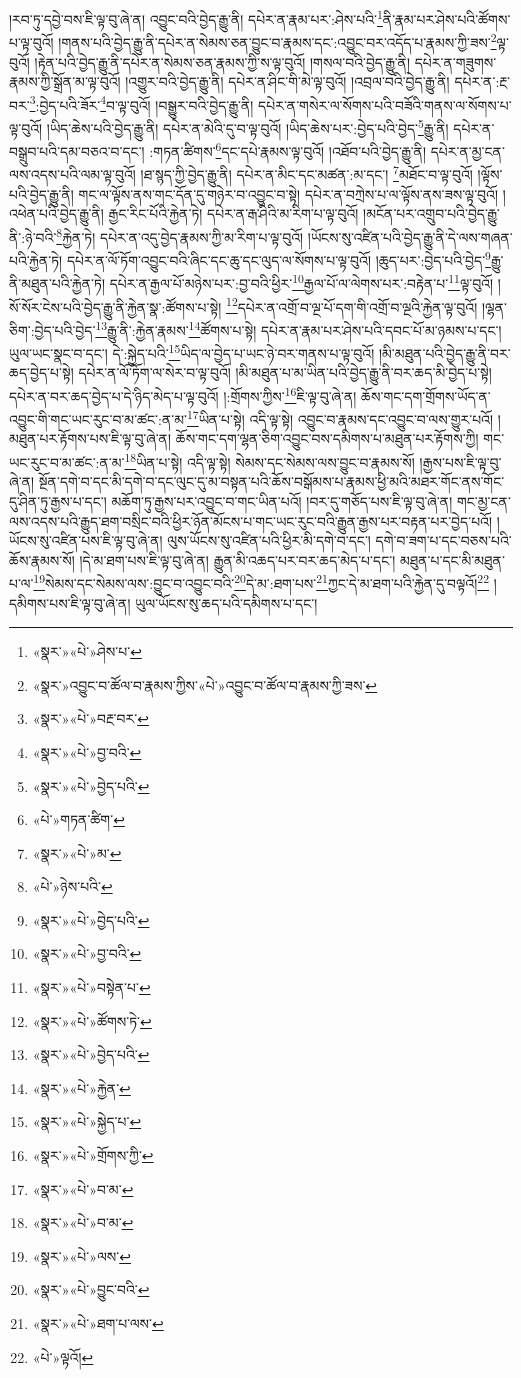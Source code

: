 །རབ་ཏུ་དབྱེ་བས་ཇི་ལྟ་བུ་ཞེ་ན། འབྱུང་བའི་བྱེད་རྒྱུ་ནི། དཔེར་ན་རྣམ་པར་:ཤེས་པའི་\footnote{«སྣར་»«པེ་»ཤེས་པ་}ནི་རྣམ་པར་ཤེས་པའི་ཚོགས་པ་ལྟ་བུའོ། །གནས་པའི་བྱེད་རྒྱུ་ནི་དཔེར་ན་སེམས་ཅན་བྱུང་བ་རྣམས་དང་:འབྱུང་བར་འདོད་པ་རྣམས་ཀྱི་ཟས་\footnote{«སྣར་»འབྱུང་བ་ཚོལ་བ་རྣམས་ཀྱིས་«པེ་»འབྱུང་བ་ཚོལ་བ་རྣམས་ཀྱི་ཟས་}ལྟ་བུའོ། །རྟེན་པའི་བྱེད་རྒྱུ་ནི་དཔེར་ན་སེམས་ཅན་རྣམས་ཀྱི་ས་ལྟ་བུའོ། །གསལ་བའི་བྱེད་རྒྱུ་ནི། དཔེར་ན་གཟུགས་རྣམས་ཀྱི་སྒྲོན་མ་ལྟ་བུའོ། །འགྱུར་བའི་བྱེད་རྒྱུ་ནི། དཔེར་ན་ཤིང་གི་མེ་ལྟ་བུའོ། །འབྲལ་བའི་བྱེད་རྒྱུ་ནི། དཔེར་ན་:རྔ་བར་\footnote{«སྣར་»«པེ་»བརྔ་བར་}:བྱེད་པའི་ཟོར་\footnote{«སྣར་»«པེ་»བྱ་བའི་}བ་ལྟ་བུའོ། །བསྒྱུར་བའི་བྱེད་རྒྱུ་ནི། དཔེར་ན་གསེར་ལ་སོགས་པའི་བཟོའི་གནས་ལ་སོགས་པ་ལྟ་བུའོ། །ཡིད་ཆེས་པའི་བྱེད་རྒྱུ་ནི། དཔེར་ན་མེའི་དུ་བ་ལྟ་བུའོ། །ཡིད་ཆེས་པར་:བྱེད་པའི་བྱེད་\footnote{«སྣར་»«པེ་»བྱེད་པའི་}རྒྱུ་ནི། དཔེར་ན་བསྒྲུབ་པའི་དམ་བཅའ་བ་དང་། :གཏན་ཚིགས་\footnote{«པེ་»གཏན་ཚིག་}དང་དཔེ་རྣམས་ལྟ་བུའོ། །འཐོབ་པའི་བྱེད་རྒྱུ་ནི། དཔེར་ན་མྱ་ངན་ལས་འདས་པའི་ལམ་ལྟ་བུའོ། །ཐ་སྙད་ཀྱི་བྱེད་རྒྱུ་ནི། དཔེར་ན་མིང་དང་མཚན་:མ་དང་། \footnote{«སྣར་»«པེ་»མ་}མཐོང་བ་ལྟ་བུའོ། །ལྟོས་པའི་བྱེད་རྒྱུ་ནི། གང་ལ་ལྟོས་ནས་གང་དོན་དུ་གཉེར་བ་འབྱུང་བ་སྟེ། དཔེར་ན་བཀྲེས་པ་ལ་ལྟོས་ནས་ཟས་ལྟ་བུའོ། །འཕེན་པའི་བྱེད་རྒྱུ་ནི། རྒྱང་རིང་པོའི་རྐྱེན་ཏེ། དཔེར་ན་རྒ་ཤིའི་མ་རིག་པ་ལྟ་བུའོ། །མངོན་པར་འགྲུབ་པའི་བྱེད་རྒྱུ་ནི་:ཉེ་བའི་\footnote{«པེ་»ཉེས་པའི་}རྐྱེན་ཏེ། དཔེར་ན་འདུ་བྱེད་རྣམས་ཀྱི་མ་རིག་པ་ལྟ་བུའོ། །ཡོངས་སུ་འཛིན་པའི་བྱེད་རྒྱུ་ནི་དེ་ལས་གཞན་པའི་རྐྱེན་ཏེ། དཔེར་ན་ལོ་ཏོག་འབྱུང་བའི་ཞིང་དང་ཆུ་དང་ལུད་ལ་སོགས་པ་ལྟ་བུའོ། །ཆུད་པར་:བྱེད་པའི་བྱེད་\footnote{«སྣར་»«པེ་»བྱེད་པའི་}རྒྱུ་ནི་མཐུན་པའི་རྐྱེན་ཏེ། དཔེར་ན་རྒྱལ་པོ་མཉེས་པར་:བྱ་བའི་ཕྱིར་\footnote{«སྣར་»«པེ་»བྱ་བའི་}རྒྱལ་པོ་ལ་ལེགས་པར་:བརྟེན་པ་\footnote{«སྣར་»«པེ་»བསྟེན་པ་}ལྟ་བུའོ། །སོ་སོར་ངེས་པའི་བྱེད་རྒྱུ་ནི་རྐྱེན་སྣ་:ཚོགས་པ་སྟེ། \footnote{«སྣར་»«པེ་»ཚོགས་ཏེ་}དཔེར་ན་འགྲོ་བ་ལྔ་པོ་དག་གི་འགྲོ་བ་ལྔའི་རྐྱེན་ལྟ་བུའོ། །ལྷན་ཅིག་:བྱེད་པའི་བྱེད་\footnote{«སྣར་»«པེ་»བྱེད་པའི་}རྒྱུ་ནི་:རྐྱེན་རྣམས་\footnote{«སྣར་»«པེ་»རྐྱེན་}ཚོགས་པ་སྟེ། དཔེར་ན་རྣམ་པར་ཤེས་པའི་དབང་པོ་མ་ཉམས་པ་དང་། ཡུལ་ཡང་སྣང་བ་དང་། དེ་:སྐྱེད་པའི་\footnote{«སྣར་»«པེ་»སྐྱེད་པ་}ཡིད་ལ་བྱེད་པ་ཡང་ཉེ་བར་གནས་པ་ལྟ་བུའོ། །མི་མཐུན་པའི་བྱེད་རྒྱུ་ནི་བར་ཆད་བྱེད་པ་སྟེ། དཔེར་ན་ལོ་ཏོག་ལ་སེར་བ་ལྟ་བུའོ། །མི་མཐུན་པ་མ་ཡིན་པའི་བྱེད་རྒྱུ་ནི་བར་ཆད་མི་བྱེད་པ་སྟེ། དཔེར་ན་བར་ཆད་བྱེད་པ་དེ་ཉིད་མེད་པ་ལྟ་བུའོ། །:གྲོགས་ཀྱིས་\footnote{«སྣར་»«པེ་»གྲོགས་ཀྱི་}ཇི་ལྟ་བུ་ཞེ་ན། ཆོས་གང་དག་གྲོགས་ཡོད་ན་འབྱུང་གི་གང་ཡང་རུང་བ་མ་ཚང་:ན་མ་\footnote{«སྣར་»«པེ་»བ་མ་}ཡིན་པ་སྟེ། འདི་ལྟ་སྟེ། འབྱུང་བ་རྣམས་དང་འབྱུང་བ་ལས་གྱུར་པའོ། །མཐུན་པར་རྟོགས་པས་ཇི་ལྟ་བུ་ཞེ་ན། ཆོས་གང་དག་ལྷན་ཅིག་འབྱུང་བས་དམིགས་པ་མཐུན་པར་རྟོགས་ཀྱི། གང་ཡང་རུང་བ་མ་ཚང་:ན་མ་\footnote{«སྣར་»«པེ་»བ་མ་}ཡིན་པ་སྟེ། འདི་ལྟ་སྟེ། སེམས་དང་སེམས་ལས་བྱུང་བ་རྣམས་སོ། །རྒྱས་པས་ཇི་ལྟ་བུ་ཞེ་ན། སྔོན་དགེ་བ་དང་མི་དགེ་བ་དང་ལུང་དུ་མ་བསྟན་པའི་ཆོས་བསྒོམས་པ་རྣམས་ཕྱི་མའི་མཐར་གོང་ནས་གོང་དུ་ཤིན་ཏུ་རྒྱས་པ་དང་། མཆོག་ཏུ་རྒྱས་པར་འབྱུང་བ་གང་ཡིན་པའོ། །བར་དུ་གཅོད་པས་ཇི་ལྟ་བུ་ཞེ་ན། གང་མྱ་ངན་ལས་འདས་པའི་རྒྱུད་ཐག་བསྲིང་བའི་ཕྱིར་ཉོན་མོངས་པ་གང་ཡང་རུང་བའི་རྒྱུན་རྒྱས་པར་བརྟན་པར་བྱེད་པའོ། །ཡོངས་སུ་འཛིན་པས་ཇི་ལྟ་བུ་ཞེ་ན། ལུས་ཡོངས་སུ་འཛིན་པའི་ཕྱིར་མི་དགེ་བ་དང་། དགེ་བ་ཟག་པ་དང་བཅས་པའི་ཆོས་རྣམས་སོ། །དེ་མ་ཐག་པས་ཇི་ལྟ་བུ་ཞེ་ན། རྒྱུན་མི་འཆད་པར་བར་ཆད་མེད་པ་དང་། མཐུན་པ་དང་མི་མཐུན་པ་ལ་\footnote{«སྣར་»«པེ་»ལས་}སེམས་དང་སེམས་ལས་:བྱུང་བ་འབྱུང་བའི་\footnote{«སྣར་»«པེ་»བྱུང་བའི་}དེ་མ་:ཐག་པས་\footnote{«སྣར་»«པེ་»ཐག་པ་ལས་}ཀྱང་དེ་མ་ཐག་པའི་རྐྱེན་དུ་བལྟའོ།\footnote{«པེ་»ལྟའོ།} །དམིགས་པས་ཇི་ལྟ་བུ་ཞེ་ན། ཡུལ་ཡོངས་སུ་ཆད་པའི་དམིགས་པ་དང་། 